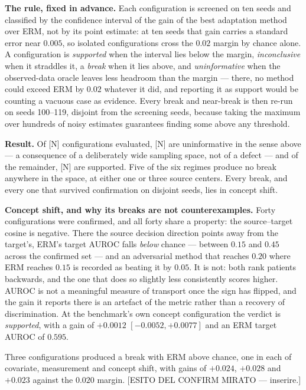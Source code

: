 \textbf{The rule, fixed in advance.}
Each configuration is screened on ten seeds and classified by the confidence
interval of the gain of the best adaptation method over ERM, not by its point
estimate: at ten seeds that gain carries a standard error near $0.005$, so
isolated configurations cross the $0.02$ margin by chance alone. A
configuration is \emph{supported} when the interval lies below the margin,
\emph{inconclusive} when it straddles it, a \emph{break} when it lies above,
and \emph{uninformative} when the observed-data oracle leaves less headroom
than the margin --- there, no method could exceed ERM by $0.02$ whatever it
did, and reporting it as support would be counting a vacuous case as evidence.
Every break and near-break is then re-run on seeds 100--119, disjoint from the
screening seeds, because taking the maximum over hundreds of noisy estimates
guarantees finding some above any threshold.

\textbf{Result.}
Of [N] configurations evaluated, [N] are uninformative in the sense above ---
a consequence of a deliberately wide sampling space, not of a defect --- and of
the remainder, [N] are supported. Five of the six regimes produce no break
anywhere in the space, at either one or three source centers. Every break, and
every one that survived confirmation on disjoint seeds, lies in concept shift.

\textbf{Concept shift, and why its breaks are not counterexamples.}
Forty configurations were confirmed, and all forty share a property: the
source--target cosine is negative. There the source decision direction points
away from the target's, ERM's target AUROC falls \emph{below} chance ---
between $0.15$ and $0.45$ across the confirmed set --- and an adversarial
method that reaches $0.20$ where ERM reaches $0.15$ is recorded as beating it
by $0.05$. It is not: both rank patients backwards, and the one that does so
slightly less consistently scores higher. AUROC is not a meaningful measure of
transport once the sign has flipped, and the gain it reports there is an
artefact of the metric rather than a recovery of discrimination. At the
benchmark's own concept configuration the verdict is \emph{supported}, with a
gain of $+0.0012$ $[-0.0052, +0.0077]$ and an ERM target AUROC of $0.595$.

Three configurations produced a break with ERM above chance, one in each of
covariate, measurement and concept shift, with gains of $+0.024$, $+0.028$ and
$+0.023$ against the $0.020$ margin. [ESITO DEL CONFIRM MIRATO — inserire.]

